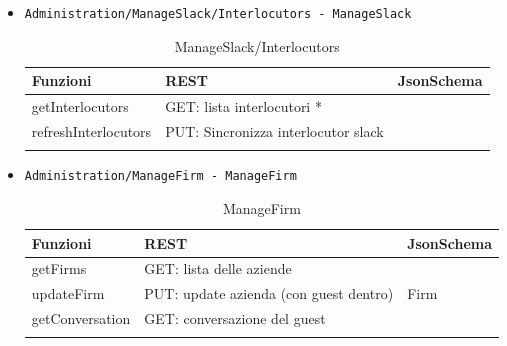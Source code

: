 \documentclass[../DefinizioneDiProdotto_v2.0.0.tex]{subfiles}
\begin{document}
\begin{itemize}
	\item \texttt{Administration/ManageSlack/Interlocutors - ManageSlack}
	      \begin{longtable}[c] { >{\centering\arraybackslash}p{4cm} >{\centering\arraybackslash}p{6cm} >{\centering\arraybackslash}p{3cm}}
	      	\toprule
	      	\centerline{\textbf{Funzioni}} & \centerline{\textbf{REST}}          & \centerline{\textbf{JsonSchema}} \\
	      	\midrule
	      	getInterlocutors               & GET: lista interlocutori *          &                                  \\
	      	\addlinespace[0.3em]
	      	\midrule
	      	\addlinespace[0.3em]
	      	refreshInterlocutors           & PUT: Sincronizza interlocutor slack &                                  \\
	      	\bottomrule
	      	\caption{ManageSlack/Interlocutors}
	      \end{longtable}
	      \newpage
	\item \texttt{Administration/ManageFirm - ManageFirm}
	      \begin{longtable}[c] { >{\centering\arraybackslash}p{3cm} >{\centering\arraybackslash}p{6cm} >{\centering\arraybackslash}p{3cm}}
	      	\toprule
	      	\centerline{\textbf{Funzioni}} & \centerline{\textbf{REST}}             & \centerline{\textbf{JsonSchema}} \\
	      	\midrule
	      	getFirms                       & GET: lista delle aziende               &                                  \\
	      	\addlinespace[0.3em]
	      	\midrule
	      	\addlinespace[0.3em]
	      	updateFirm                     & PUT: update azienda (con guest dentro) & Firm                             \\
	      	\addlinespace[0.3em]
	      	\midrule
	      	\addlinespace[0.3em]
	      	getConversation                & GET: conversazione del guest           &                                  \\

	      	\bottomrule
	      	\caption{ManageFirm}
	      \end{longtable}


\end{itemize}
\end{document}
